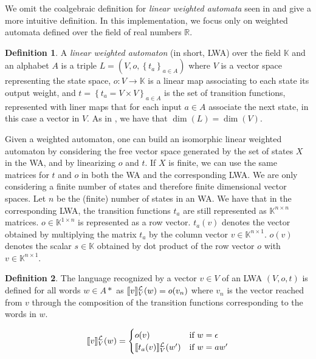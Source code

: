 \documentclass{article}
\theoremstyle{plain}%
\theoremstyle{definition}
\newtheorem{defn}{Definition}[section]
\theoremstyle{remark}
\def\R{\mathbb{R}}
\def\K{\mathbb{K}}
\DeclarePairedDelimiter\sqmap{\llbracket}{\rrbracket}
\newcommand{\langlwa}[2]{\sqmap{#1}^\mathcal{L}_{#2}}
\begin{document}

We omit the coalgebraic definition for \textit{linear weighted automata} seen in 
\cite{BONCHI201277} and give a more intuitive definition. 
In this implementation, we focus only on weighted automata defined over 
the field of real numbers $\R$. 

\begin{defn}
  A \textit{linear weighted automaton} (in short, LWA) over the field $\K$ and an alphabet $A$
  is a triple  $L = (V, o, \left\lbrace t_a \right\rbrace_{a \in A})$ 
  where $V$ is a vector space representing the state space, 
  $o: V \to \K$ is a linear map associating to each state its output weight,
  and $t = \left\lbrace t_a = V \times V \right\rbrace_{a \in A}$ is
  the set of transition functions, represented with liner maps 
  that for each input $a \in A$ associate the next state, in this case a vector
  in $V$.
  As in \cite{boreale2009weighted}, we have that $\dim{(L)} = \dim{(V)}$.
\end{defn}

Given a weighted automaton, one can build an isomorphic linear weighted automaton
by considering the free vector space generated by the set of states $X$ in the WA,
and by linearizing $o$ and $t$. If $X$ is finite, we can use the same matrices for 
$t$ and $o$ in both the WA and the corresponding LWA.
We are only considering a finite number of states and therefore finite dimensional
vector spaces. Let $n$ be the (finite) number of states in an WA.
We have that in the corresponding LWA, the transition functions $t_a$ are still
 represented as
$\K^{n \times n}$ matrices. $o \in \K^{1 \times n}$ is represented as a row vector.
$t_a(v)$ denotes the vector obtained by multiplying the matrix $t_a$ by the column 
vector $v  \in \K^{n \times 1}$. $o(v)$ denotes the scalar $s \in \K$ obtained by 
dot product of the row vector $o$ with $v \in \K^{n \times 1}$.

\begin{defn}
  The language recognized by a vector $v \in V$ of an LWA $(V,o,t)$ is defined
  for all words $w \in A*$ as $\langlwa{v}{V}(w) = o(v_n)$ where $v_n$ is the 
  vector reached from $v$ through the composition of the transition functions
  corresponding to the words in $w$.
  
  \begin{equation*}
    \begin{aligned}
      \langlwa{v}{V}(w) = \begin{cases}
        o(v) & \text{if } w = \epsilon \\ 
        \langlwa{t_a(v)}{V}(w') & \text{if } w = aw' 
      \end{cases}
    \end{aligned}
  \end{equation*}
  
\end{defn}
\end{document}

